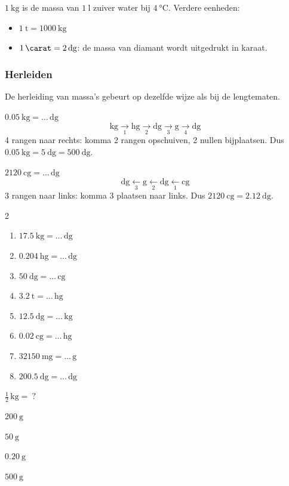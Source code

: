 \documentclass{bis}
\begin{document}
\noindent\(\SI{1}{\kilo\gram}\) is de massa van \(\SI{1}{\litre}\) zuiver water bij \(\SI{4}{\celsius}\). Verdere eenheden:
\begin{itemize}
  \item \(\SI{1}{\tonne}=\SI{1000}{\kilo\gram}\)
  \item \(\SI{1}{\carat}=\SI{2}{\deci\gram}\): de massa van diamant wordt uitgedrukt in karaat.
\end{itemize}

\subsubsection{Herleiden}
De herleiding van massa's gebeurt op dezelfde wijze als bij de lengtematen.

\begin{voorbeeld}
\(\SI{0.05}{\kilo\gram}=\ldots\,\si{\deci\gram}\)
\[
\si{\kilo\gram}\xrightarrow[1]{}\si{\hecto\gram}\xrightarrow[2]{}\si{\deca\gram}\xrightarrow[3]{}\si{\gram}\xrightarrow[4]{}\si{\deci\gram}
\]
4 rangen naar rechts: komma 2 rangen opschuiven, 2 nullen bijplaatsen. Dus \(\SI{0.05}{\kilo\gram}=\SI{5}{\deca\gram}=\SI{500}{\deci\gram}\).
\end{voorbeeld}

\begin{voorbeeld}
\(\SI{2120}{\centi\gram}=\ldots\,\si{\deca\gram}\)
\[
\si{\deca\gram}\xleftarrow[3]{}\si{\gram}\xleftarrow[2]{}\si{\deci\gram}\xleftarrow[1]{}\si{\centi\gram}
\]
3 rangen naar links: komma 3 plaatsen naar links. Dus \(\SI{2120}{\centi\gram}=\SI{2.12}{\deca\gram}\).
\end{voorbeeld}

\begin{exercise}
\begin{multicols}{2}
  \begin{enumerate}
  \item \(\SI{17.5}{\kilo\gram}=\ldots\,\si{\deca\gram}\)
  \item \(\SI{0.204}{\hecto\gram}=\ldots\,\si{\deci\gram}\)
  \item \(\SI{50}{\deca\gram}=\ldots\,\si{\centi\gram}\)
  \item \(\SI{3.2}{\tonne}=\ldots\,\si{\hecto\gram}\)
  \item \(\SI{12.5}{\deca\gram}=\ldots\,\si{\kilo\gram}\)
  \item \(\SI{0.02}{\centi\gram}=\ldots\,\si{\hecto\gram}\)
  \item \(\SI{32150}{\milli\gram}=\ldots\,\si{\gram}\)
  \item \(\SI{200.5}{\deci\gram}=\ldots\,\si{\deca\gram}\)
  \end{enumerate}
\end{multicols}

\(\tfrac{1}{2}\,\si{\kilo\gram}=\ ?\)
\begin{meerkeuze}
  \item \(\SI{200}{\gram}\)
  \item \(\SI{50}{\gram}\)
  \item \(\SI{0.20}{\gram}\)
  \item \(\SI{500}{\gram}\)
\end{meerkeuze}
\end{exercise}
\end{document}
